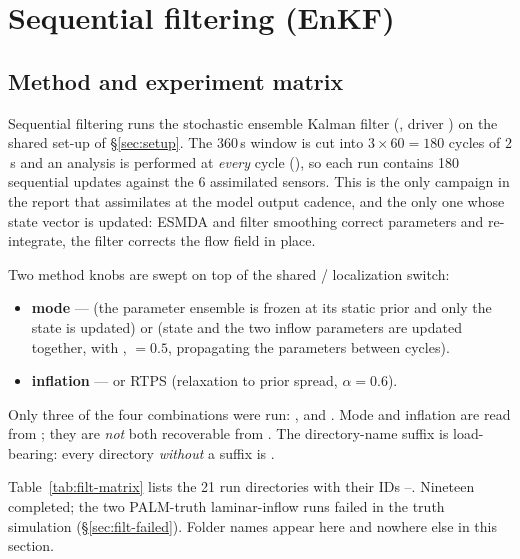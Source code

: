 \begingroup\sloppy
\section{Sequential filtering (EnKF)}
\label{sec:filtering}



\subsection{Method and experiment matrix}
\label{sec:filt-matrix}

Sequential filtering runs the stochastic ensemble Kalman filter
(, driver
) on the shared set-up of
\S\ref{sec:setup}. The 360\,s window is cut into $3\times60 = 180$ cycles of
$2$\,s and an analysis is performed at \emph{every} cycle
(), so each run contains 180 sequential
updates against the 6 assimilated sensors. This is the only campaign in the
report that assimilates at the model output cadence, and the only one whose
state vector is updated: ESMDA and filter smoothing correct parameters and
re-integrate, the filter corrects the flow field in place.

Two method knobs are swept on top of the shared  /
 localization switch:
\begin{itemize}[nosep]
  \item \textbf{mode} ---  (the parameter ensemble is frozen at its
        static prior and only the state is updated) or  (state and
        the two inflow parameters are updated together, with
        , $=0.5$, propagating the parameters
        between cycles).
  \item \textbf{inflation} ---  or RTPS (relaxation to prior spread,
        $\alpha=0.6$).
\end{itemize}
Only three of the four combinations were run: ,
 and . Mode and inflation are read from
; they are \emph{not} both recoverable from
. The directory-name suffix is
load-bearing: every directory \emph{without} a  suffix is
.

Table~\ref{tab:filt-matrix} lists the 21 run directories with their IDs
--. Nineteen completed; the two PALM-truth laminar-inflow
runs failed in the truth simulation (\S\ref{sec:filt-failed}). Folder names
appear here and nowhere else in this section.

